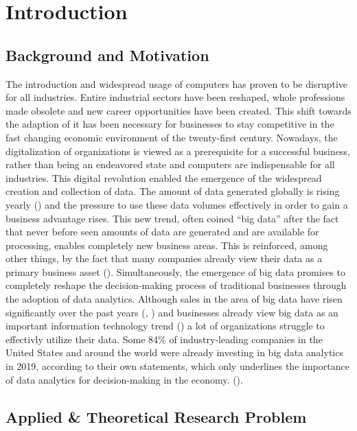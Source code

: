 \newpage\section{Introduction}

\subsection{Background and Motivation}

The introduction and widespread usage of computers has proven to be disruptive for all industries. Entire industrial sectors have been reshaped, whole professions made obsolete and new career opportunities have been created. This shift towards the adaption of \ac{it} has been necessary for businesses to stay competitive in the fast changing economic environment of the twenty-first century. Nowadays, the digitalization of organizations is viewed as a prerequisite for a successful business, rather than being an endeavored state and computers are indispensable for all industries. This digital revolution enabled the emergence of the widespread creation and collection of data. The amount of data generated globally is rising yearly (\cite{Seagate.2018}) and the pressure to use these data volumes effectively in order to gain a business advantage rises. 
This new trend, often coined \enquote{big data} after the fact that never before seen amounts of data are generated and are available for processing, enables completely new business areas. This is reinforced, among other things, by the fact that many companies already view their data as a primary business asset (\cite{Redman.2008}). Simultaneously, the emergence of big data promises to completely reshape the decision-making process of traditional businesses through the adoption of data analytics. Although sales in the area of big data have risen significantly over the past years (\cite{BISResearch.2018}, \cite{Bitkom.2018}) and businesses already view big data as an important information technology trend (\cite{Bitkom.2017}) a lot of organizations struggle to effectivly utilize their data. Some 84\% of industry-leading companies in the United States and around the world were already investing in big data analytics in 2019, according to their own statements, which only underlines the importance of data analytics for decision-making in the economy. (\cite{statista.2019}).\newline

\subsection{Applied \& Theoretical Research Problem} %

